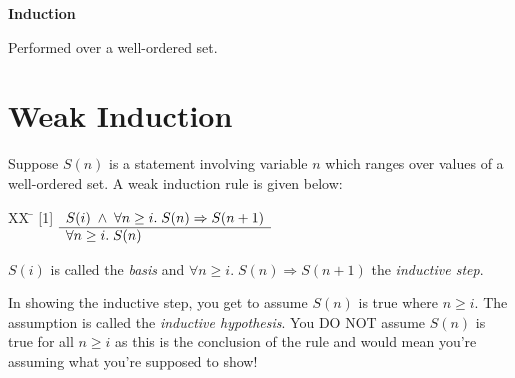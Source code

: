 \documentclass[12pt]{article}
\newtheorem{lemma}[theorem]{Lemma}
\begin{document}
\begin{flushleft}
{\huge {\bf Induction}}
\end{flushleft}

\vspace{7mm}
\noindent Performed over a well-ordered set.


\thispagestyle{empty}	

\section{Weak Induction}

Suppose $S(n)$ is a statement involving variable $n$ which ranges over
values of a well-ordered set.
A weak induction rule is given below:
\begin{tabbing}
[1]XX \=  \kill
[1] \>
	\(\begin{array}[t]{l}
	S(i) \;\wedge\; \forall n \geq i.\;S(n) \Rightarrow S(n+1) \\
	\hline
	\forall n \geq i. \; S(n)
	\end{array}\) %
\end{tabbing}
$S(i)$ is called the {\em basis\/} and $\forall n \geq i.\;S(n) \Rightarrow S(n+1)$
the {\em inductive step\/}.  %

In showing the inductive step, you get to assume $S(n)$ is true where $n\geq i$.
The assumption is called the {\em inductive hypothesis\/}.
You DO NOT assume $S(n)$ is true for all $n\geq i$ as this is the conclusion of the rule
and would mean you're assuming what you're supposed to show!


\end{document}
